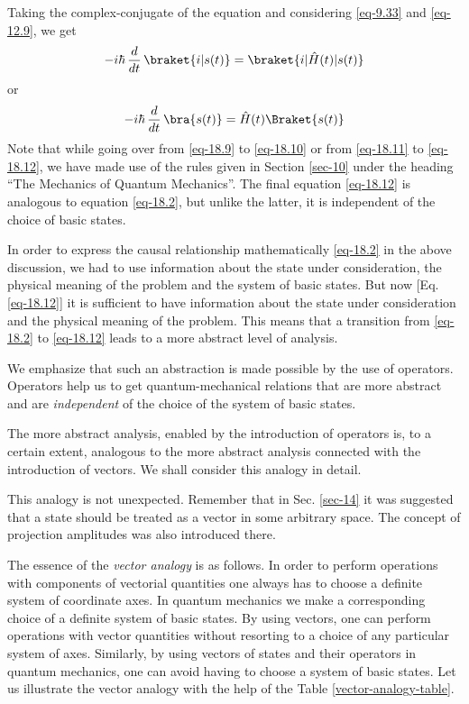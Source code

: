 \documentclass[a4paper,sfsidenotes,colorlinks=true]{tufte-book}
\numberwithin{equation}{section}
\numberwithin{figure}{section}
\begin{document}
Taking the complex-conjugate of the equation and considering \ref{eq-9.33} and \ref{eq-12.9}, we get 
\begin{equation}
- i \hbar \, \frac{d}{dt} \, \braket{i |s(t)} = \braket{i| \hat{H} (t)|s(t)}
\label{eq-18.11}
\end{equation}
or 
\begin{equation}
- i \hbar \, \frac{d}{dt} \, \bra{s(t)} = \hat{H} (t) \Braket{s(t)}
\label{eq-18.12}
\end{equation}
Note that while going over from \ref{eq-18.9} to \ref{eq-18.10} or
from \ref{eq-18.11} to \ref{eq-18.12}, we have made use of the rules
given in Section \ref{sec-10} under the heading ``The Mechanics of Quantum
Mechanics''. The final equation \ref{eq-18.12} is analogous to equation
\ref{eq-18.2}, but unlike the latter, it is independent of the choice of
basic states.

In  order to express the causal
relationship mathematically \ref{eq-18.2} in the above discussion, we
had to use information about the state under consideration, the
physical meaning of the problem and the system of basic states. But
now [Eq. \ref{eq-18.12}] it is sufficient to have information about the state
under consideration and the physical meaning of the problem. This
means that a transition from \ref{eq-18.2} to \ref{eq-18.12} leads to a more
abstract level of analysis.

We emphasize that such an abstraction is made possible by the use of
operators. Operators help us to get quantum-mechanical relations that
are more abstract and are \emph{independent} of the choice of the system of
basic states.

The more abstract analysis, enabled by the introduction of operators
is, to a certain extent, analogous to the more abstract analysis
connected with the introduction of vectors. We shall consider this
analogy in detail. 

This analogy is not unexpected. Remember that in Sec. \ref{sec-14} it was
suggested that a state should be treated as a vector in some arbitrary
space. The concept of projection amplitudes was also introduced
there.

The essence of the \emph{vector analogy} is as follows. In order to
perform operations with components of vectorial quantities one always
has to choose a definite system of coordinate axes. In quantum
mechanics we make a corresponding choice of a definite system of basic
states. By using vectors, one can perform operations with vector
quantities without resorting to a choice of any particular system of
axes. Similarly, by using vectors of states and their operators in
quantum mechanics, one can avoid having to choose a system of basic
states. Let us illustrate the vector analogy with the help of the
Table \ref{vector-analogy-table}.
\end{document}

